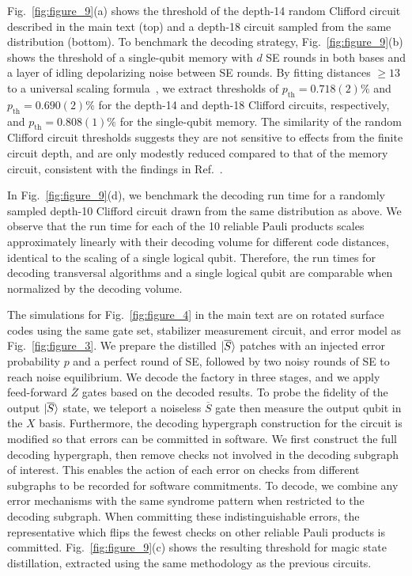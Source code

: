 \documentclass[prx,twocolumn,secnumarabic,balancelastpage,amsmath,amssymb,longbibliography]{revtex4-2}
\newcommand{\lop}[1]{\overline{#1}}
\newcommand{\lket}[1]{\ket{\overline{#1}}}
\newcommand{\pth}{p_\text{th}}
\newcommand{\pthclifforddeeper}{0.690(2)\%}
\newcommand{\pthclifforddeep}{0.718(2)\%}
\newcommand{\pthmemory}{0.808(1)\%}
\begin{document}
Fig.~\ref{fig:figure_9}(a) shows the threshold of the depth-14 random Clifford circuit described in the main text (top) and a depth-18 circuit sampled from the same distribution (bottom).
%
To benchmark the decoding strategy, Fig.~\ref{fig:figure_9}(b) shows the threshold of a single-qubit memory with $d$ SE rounds in both bases and a layer of idling depolarizing noise between SE rounds.
%
By fitting distances $\geq 13$ to a universal scaling formula~\cite{wang2003confinement, watson2014logical}, we extract thresholds of $\pth = \pthclifforddeep$ and $\pth = \pthclifforddeeper$ for the depth-14 and depth-18 Clifford circuits, respectively, and $\pth = \pthmemory$ for the single-qubit memory.
%
The similarity of the random Clifford circuit thresholds suggests they are not sensitive to effects from the finite circuit depth, and are only modestly reduced compared to that of the memory circuit, consistent with the findings in Ref.~\cite{cain2024correlated}.

In Fig.~\ref{fig:figure_9}(d), we benchmark the decoding run time for a randomly sampled depth-10 Clifford circuit drawn from the same distribution as above.
%
We observe that the run time for each of the 10 reliable Pauli products scales approximately linearly with their decoding volume for different code distances, identical to the scaling of a single logical qubit.
%
Therefore, the run times for decoding transversal algorithms and a single logical qubit are comparable when normalized by the decoding volume.

The simulations for Fig.~\ref{fig:figure_4} in the main text are on rotated surface codes using the same gate set, stabilizer measurement circuit, and error model as Fig.~\ref{fig:figure_3}.
%
We prepare the distilled $\lket{S}$ patches with an injected error probability $p$ and a perfect round of SE, followed by two noisy rounds of SE to reach noise equilibrium. 
%
We decode the factory in three stages, and we apply feed-forward $\lop{Z}$ gates based on the decoded results.
%
To probe the fidelity of the output $\lket{S}$ state, we teleport a noiseless $\lop{S}$ gate then measure the output qubit in the $X$ basis. 
%
Furthermore, the decoding hypergraph construction for the circuit is modified so that errors can be committed in software.
%
We first construct the full decoding hypergraph, then remove checks not involved in the decoding subgraph of interest. 
%
This enables the action of each error on checks from different subgraphs to be recorded for software commitments.
%
To decode, we combine any error mechanisms with the same syndrome pattern when restricted to the decoding subgraph.
%
When committing these indistinguishable errors, the representative which flips the fewest checks on other reliable Pauli products is committed.
%
Fig.~\ref{fig:figure_9}(c) shows the resulting threshold for magic state distillation, extracted using the same methodology as the previous circuits.
\end{document}
